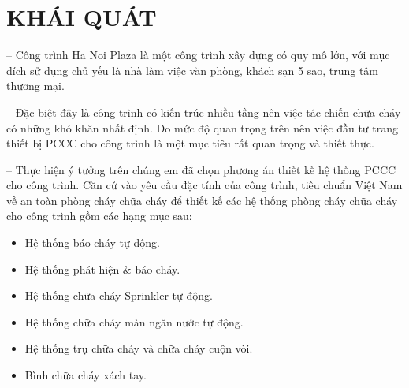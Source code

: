 \fancyhead[L]{\leftmark}
\section{KHÁI QUÁT}
-- Công trình Ha Noi Plaza là một công trình xây dựng có quy mô lớn, với mục đích sử dụng chủ yếu là nhà làm việc văn phòng, khách sạn 5 sao, trung tâm thương mại. 

-- Đặc biệt đây là công trình có kiến trúc nhiều tầng nên việc tác chiến chữa cháy có những khó khăn nhất định. Do mức độ quan trọng trên nên việc đầu tư trang thiết bị PCCC cho công trình là một mục tiêu rất quan trọng và thiết thực.

-- Thực hiện ý tưởng trên chúng em đã chọn phương án thiết kế hệ thống PCCC cho công trình. Căn cứ vào yêu cầu đặc tính của công trình, tiêu chuẩn Việt Nam về an toàn phòng cháy chữa cháy để thiết kế các hệ thống phòng cháy chữa cháy cho công trình gồm các hạng mục sau:
\begin{itemize}[label={-}]
	\item Hệ thống báo cháy tự động.
	\item Hệ thống phát hiện \& báo cháy.
	\item Hệ thống chữa cháy Sprinkler tự động.
	\item Hệ thống chữa cháy màn ngăn nước tự động.
	\item Hệ thống trụ chữa cháy và chữa cháy cuộn vòi.
	\item Bình chữa cháy xách tay.
\end{itemize}
